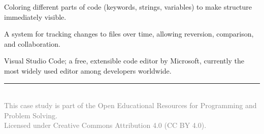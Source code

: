 \documentclass[11pt,letterpaper]{article}
\newcommand{\cscourse}{Programming and Problem Solving}
\begin{document}
\begin{glossarybox}
\begin{description}[leftmargin=!, labelwidth=3.6cm, font=\bfseries\color{cssecondary}]
    \item[Syntax Highlighting] Coloring different parts of code (keywords, strings, variables) to make structure immediately visible.

    \item[Version Control] A system for tracking changes to files over time, allowing reversion, comparison, and collaboration.

    \item[VS Code] Visual Studio Code; a free, extensible code editor by Microsoft, currently the most widely used editor among developers worldwide.
\end{description}
\end{glossarybox}

\vspace{5mm}

\begin{center}
\textcolor{csprimary}{\rule{0.6\textwidth}{0.5pt}}\\[3mm]
{\small\textcolor{gray}{This case study is part of the Open Educational Resources for \cscourse.\\
Licensed under Creative Commons Attribution 4.0 (CC BY 4.0).}}
\end{center}
\end{document}
